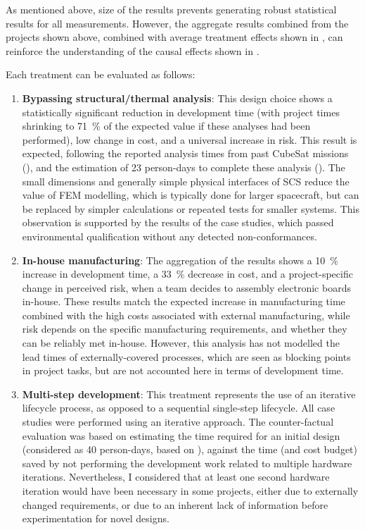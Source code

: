 \documentclass[a4paper,nobib,justified,final]{tufte-book}
\begin{document}
As mentioned above, size of the results prevents generating robust statistical results for all measurements. However, the aggregate results combined from the projects shown above, combined with average treatment effects shown in , can reinforce the understanding of the causal effects shown in .

Each treatment can be evaluated as follows:
\begin{enumerate}
	\item \textbf{Bypassing structural/thermal analysis}:
	This design choice shows a statistically significant reduction in development time (with project times shrinking to \qty{71}{\percent} of the expected value if these analyses had been performed), low change in cost, and a universal increase in risk. This result is expected, following the reported analysis times from past CubeSat missions (), and the estimation of 23 person-days to complete these analysis (). The small dimensions and generally simple physical interfaces of \acs{SCS} reduce the value of \acs{FEM} modelling, which is typically done for larger spacecraft, but can be replaced by simpler calculations or repeated tests for smaller systems. This observation is supported by the results of the case studies, which passed environmental qualification without any detected non-conformances.
	\item \textbf{In-house manufacturing}:
	The aggregation of the results shows a \qty{10}{\percent} increase in development time, a \qty{33}{\percent} decrease in cost, and a project-specific change in perceived risk, when a team decides to assembly electronic boards in-house.
	These results match the expected increase in manufacturing time combined with the high costs associated with external manufacturing, while risk depends on the specific manufacturing requirements, and whether they can be reliably met in-house. However, this analysis has not modelled the lead times of externally-covered processes, which are seen as blocking points in project tasks, but are not accounted here in terms of development time.
	\item \textbf{Multi-step development}:
	This treatment represents the use of an iterative lifecycle process, as opposed to a sequential single-step lifecycle. All case studies were performed using an iterative approach. The counter-factual evaluation was based on estimating the time required for an initial design (considered as 40 person-days, based on ), against the time (and cost budget) saved by not performing the development work related to multiple hardware iterations. Nevertheless, I considered that at least one second hardware iteration would have been necessary in some projects, either due to externally changed requirements, or due to an inherent lack of information before experimentation for novel designs.


\end{enumerate}
\end{document}
